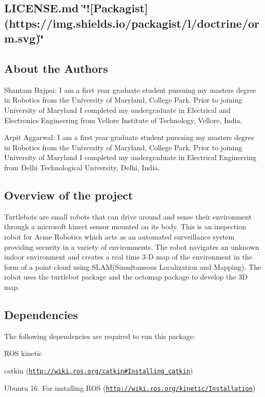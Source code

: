 \href{https://travis-ci.org/arp95/enpm808x_turtlebot_navigator}{\tt } \href{https://coveralls.io/github/arp95/enpm808x_turtlebot_navigator?branch=master}{\tt } \subsection*{L\+I\+C\+E\+N\+S\+E.\+md \char`\"{}!\mbox{[}\+Packagist\mbox{]}(https\+://img.\+shields.\+io/packagist/l/doctrine/orm.\+svg)\char`\"{} }

\subsection*{About the Authors}

Shantam Bajpai\+: I am a first year graduate student pursuing my masters degree in Robotics from the University of Maryland, College Park. Prior to joining University of Maryland I completed my undergraduate in Electrical and Electronics Engineering from Vellore Institute of Technology, Vellore, India.

Arpit Aggarwal\+: I am a first year graduate student pursuing my masters degree in Robotics from the University of Maryland, College Park. Prior to joining University of Maryland I completed my undergraduate in Electrical Engineering from Delhi Technological University, Delhi, India.

\subsection*{Overview of the project}

Turtlebots are small robots that can drive around and sense their environment through a microsoft kinect sensor mounted on its body. This is an inspection robot for Acme Robotics which acts as an automated surveillance system providing security in a variety of environments. The robot navigates an unknown indoor environment and creates a real time 3-\/D map of the environment in the form of a point cloud using S\+L\+A\+M(\+Simultaneous Localization and Mapping). The robot uses the turtlebot package and the octomap package to develop the 3D map.

\subsection*{Dependencies}

The following dependencies are required to run this package\+:


\begin{DoxyEnumerate}
\item R\+OS kinetic
\item catkin (\href{http://wiki.ros.org/catkin#Installing_catkin}{\tt http\+://wiki.\+ros.\+org/catkin\#\+Installing\+\_\+catkin})
\item Ubuntu 16. For installing R\+OS (\href{http://wiki.ros.org/kinetic/Installation}{\tt http\+://wiki.\+ros.\+org/kinetic/\+Installation})
\end{DoxyEnumerate}

